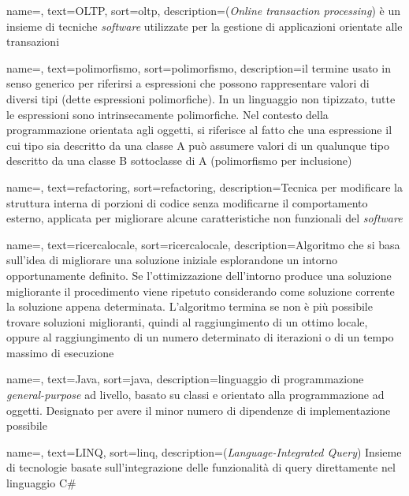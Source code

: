 {
    name=,
    text=OLTP,
    sort=oltp,
    description={(\textit{Online transaction processing}) è un insieme di tecniche \textit{software} utilizzate per
    la gestione di applicazioni orientate alle transazioni}
}

{
    name=,
    text=polimorfismo,
    sort=polimorfismo,
    description={il termine usato in senso generico
    per riferirsi a espressioni che possono rappresentare valori di diversi tipi (dette
    espressioni polimorfiche). In un linguaggio non tipizzato, tutte le espressioni
    sono intrinsecamente polimorfiche. Nel contesto della programmazione orientata
    agli oggetti, si riferisce al fatto che una espressione il cui tipo sia descritto da
    una classe A può assumere valori di un qualunque tipo descritto da una classe B
    sottoclasse di A (polimorfismo per inclusione)}
}

{
    name=,
    text=refactoring,
    sort=refactoring,
    description={Tecnica per modificare la struttura interna di porzioni di codice
    senza modificarne il comportamento esterno, applicata per migliorare alcune
    caratteristiche non funzionali del \textit{software}}
}

{
    name=,
    text=ricercalocale,
    sort=ricercalocale,
    description={Algoritmo che si basa sull’idea di migliorare
    una soluzione iniziale esplorandone un intorno
    opportunamente definito. Se l’ottimizzazione
    dell’intorno produce una soluzione migliorante
    il procedimento viene ripetuto
    considerando come soluzione corrente la soluzione
    appena determinata. L’algoritmo termina se non è più
    possibile trovare soluzioni miglioranti, quindi al
    raggiungimento di un ottimo locale, oppure al
    raggiungimento di un numero
    determinato di iterazioni o di un tempo massimo di esecuzione}
}

{
    name=,
    text=Java,
    sort=java,
    description={linguaggio di programmazione
    \textit{general-purpose} ad livello, basato su classi
    e orientato alla programmazione ad oggetti. Designato
    per avere il minor numero di dipendenze di implementazione
    possibile}
}

{
    name=,
    text=LINQ,
    sort=linq,
    description={(\textit{Language-Integrated Query})
    Insieme di tecnologie basate sull'integrazione delle funzionalità di query direttamente nel linguaggio C\#}
}


